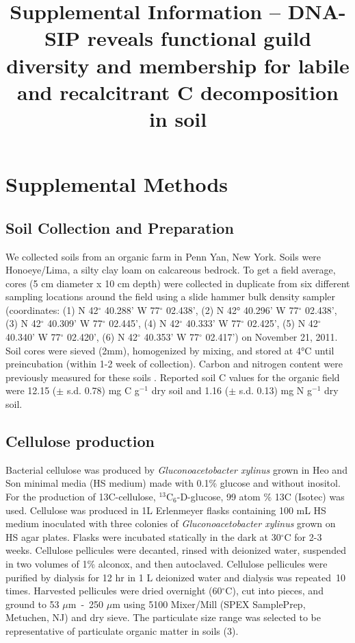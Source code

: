 \documentclass{article}
\title{Supplemental Information -- DNA-SIP reveals functional guild
diversity and membership for labile and recalcitrant C decomposition in
soil}
\date{\vspace{-5ex}}
\begin{document}
\maketitle

\tableofcontents

\listoffigures 

\listoftables

\section{Supplemental Methods}\label{SI} 

\subsection{Soil Collection and Preparation} We collected soils from an organic
farm in Penn Yan, New York. Soils were Honoeye/Lima, a silty clay loam on
calcareous bedrock. To get a field average, cores (5 cm diameter x 10 cm depth)
were collected in duplicate from six different sampling locations around the
field using a slide hammer bulk density sampler (coordinates: (1)
N 42$^{\circ}$ 40.288’ W 77$^{\circ}$ 02.438’, (2) N 42° 40.296’ W 77$^{\circ}$
02.438’, (3) N 42$^{\circ}$ 40.309’ W 77$^{\circ}$ 02.445’, (4) N 42$^{\circ}$
40.333’ W 77$^{\circ}$ 02.425’, (5) N 42$^{\circ}$ 40.340’ W 77$^{\circ}$
02.420’, (6) N 42$^{\circ}$ 40.353’ W 77$^{\circ}$ 02.417’) on November 21,
2011. Soil cores were sieved (2mm), homogenized by mixing, and
stored at 4°C until preincubation (within 1-2 week of collection).
Carbon and nitrogen content were previously measured for these soils
\citep{Berthrong_2013}. Reported soil C values for the organic field were
12.15 ($\pm$ s.d. 0.78) mg C g$^{-1}$ dry soil and 1.16 ($\pm$ s.d. 0.13)
mg N g$^{-1}$ dry soil. 

\subsection{Cellulose production}
Bacterial cellulose was produced by \textit{Gluconoacetobacter xylinus} grown
in Heo and Son \citep{Heo_2002} minimal media (HS medium) made with 0.1\%
glucose and without inositol.  For the production of 13C-cellulose,
$^{13}$C$_{6}$-D-glucose, 99 atom \% 13C (Isotec) was used. Cellulose was
produced in 1L Erlenmeyer flasks containing 100 mL HS medium inoculated with
three colonies of \textit{Gluconoacetobacter xylinus} grown on HS agar plates.
Flasks were incubated statically in the dark at 30$^{\circ}$C for 2-3 weeks.
Cellulose pellicules were decanted, rinsed with deionized water, suspended in
two volumes of 1\% alconox, and then autoclaved. Cellulose pellicules were
purified by dialysis for 12 hr in 1 L deionized water and dialysis was
repeated~10 times. Harvested pellicules were dried overnight (60$^{\circ}$C),
cut into pieces, and ground to 53 $\mu$m~-~250 $\mu$m using 5100 Mixer/Mill (SPEX
SamplePrep, Metuchen, NJ) and dry sieve. The particulate size range was
selected to be representative of particulate organic matter in soils (3).
\end{document}
